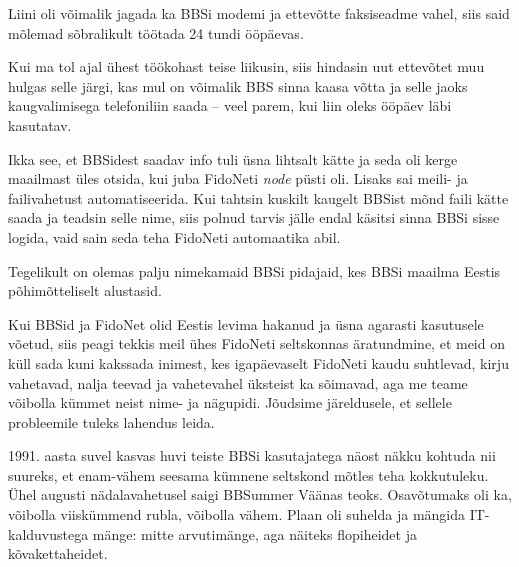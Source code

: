 Liini oli võimalik jagada ka BBSi modemi ja ettevõtte faksiseadme vahel, siis said
mõlemad sõbralikult töötada 24 tundi ööpäevas.

Kui ma tol ajal ühest töökohast teise liikusin, siis hindasin
uut ettevõtet muu hulgas selle järgi, kas mul on võimalik 
BBS sinna kaasa võtta ja selle jaoks 
kaugvalimisega telefoniliin saada -- veel parem, kui liin oleks ööpäev läbi kasutatav.


Ikka see, et BBSidest saadav info tuli üsna lihtsalt kätte ja seda oli kerge maailmast üles otsida, kui juba FidoNeti \emph{node} püsti 
oli. Lisaks sai meili- ja 
failivahetust automatiseerida. Kui tahtsin kuskilt kaugelt BBSist mõnd 
faili kätte saada ja teadsin selle nime, siis polnud tarvis jälle endal käsitsi 
sinna BBSi sisse logida, vaid sain seda teha 
FidoNeti automaatika abil.


Tegelikult on olemas palju nimekamaid 
BBSi pidajaid, kes BBSi maailma Eestis põhimõtteliselt alustasid.

Kui BBSid ja FidoNet olid Eestis 
levima hakanud ja üsna agarasti kasutusele võetud, siis peagi tekkis meil 
ühes FidoNeti seltskonnas äratundmine, et meid on 
küll sada kuni kakssada inimest, kes igapäevaselt FidoNeti 
kaudu suhtlevad, kirju vahetavad, nalja teevad ja vahetevahel üksteist ka sõimavad, aga me teame võibolla kümmet neist nime- ja nägupidi. Jõudsime
järeldusele, et sellele probleemile tuleks lahendus leida. 

1991. aasta suvel kasvas huvi teiste BBSi kasutajatega näost näkku kohtuda nii suureks, 
et enam-vähem seesama kümnene seltskond mõtles teha kokkutuleku. Ühel augusti nädalavahetusel saigi BBSummer Väänas teoks. Osavõtumaks oli ka, 
võibolla viiskümmend rubla, võibolla vähem. Plaan oli suhelda ja mängida 
IT-kalduvustega mänge: mitte arvutimänge, aga näiteks flopiheidet ja 
kõvakettaheidet. 

